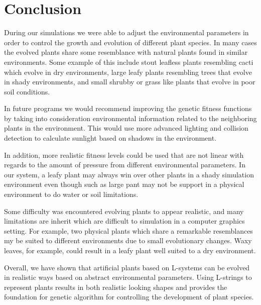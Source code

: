 \documentclass[conference]{acmsiggraph}
\begin{document}
\section{Conclusion}

During our simulations we were able to adjust the environmental parameters in
order to control the growth and evolution of different plant species. In many
cases the evolved plants share some resemblance with natural plants found in
similar environments. Some example of this include stout leafless plants
resembling cacti which evolve in dry environments, large leafy plants resembling
trees that evolve in shady environments, and small shrubby or grass like plants
that evolve in poor soil conditions.

In future programs we would recommend improving the genetic fitness functions by
taking into consideration environmental information related to the neighboring
plants in the environment. This would use more advanced lighting and collision
detection to calculate sunlight based on shadows in the environment.

In addition, more realistic fitness levels could be used that are not linear
with regards to the amount of pressure from different environmental parameters.
In our system, a leafy plant may always win over other plants in a shady
simulation environment even though such as large pant may not be support in a
physical environment to do water or soil limitations.

Some difficulty was encountered evolving plants to appear realistic, and many
limitations are inherit which are difficult to simulation in a computer graphics
setting. For example, two physical plants which share a remarkable resemblances
my be suited to different environments due to small evolutionary changes. Waxy
leaves, for example, could result in a leafy plant well suited to a dry
environment.

Overall, we have shown that artificial plants based on L-systems can be evolved
in realistic ways based on abstract environmental parameters. Using L-strings to
represent plants results in both realistic looking shapes and provides the
foundation for genetic algorithm for controlling the development of plant
species.




\end{document}
